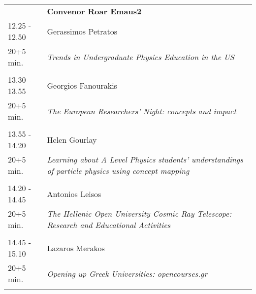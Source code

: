 \begin{longtable}{p{3cm}p{13cm}}
&\hfill {\bf Convenor Roar Emaus2 }\\ 
12.25 - 12.50 & Gerassimos Petratos\\ 
20+5 min. & {\it Trends in Undergraduate Physics Education in the US}\\ 
 & \\ 
13.30 - 13.55 & Georgios Fanourakis\\ 
20+5 min. & {\it The European Researchers' Night: concepts and impact}\\ 
 & \\ 
13.55 - 14.20 & Helen Gourlay\\ 
20+5 min. & {\it Learning about A Level Physics students’ understandings of particle physics using concept mapping}\\ 
 & \\ 
14.20 - 14.45 & Antonios Leisos\\ 
20+5 min. & {\it The Hellenic Open University Cosmic Ray Telescope: Research and Educational Activities}\\ 
 & \\ 
14.45 - 15.10 & Lazaros Merakos\\ 
20+5 min. & {\it Opening up Greek Universities: opencourses.gr}\\ 
 & \\ 
\end{longtable}

